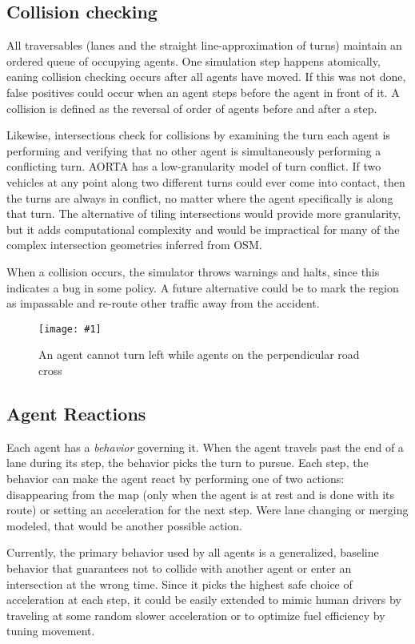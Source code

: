 \documentclass[letterpaper, 10 pt, conference]{ieeeconf}  %
\newcommand{\pix}[3]{
  \begin{figure}[h]
    \centering \texttt{[image: \#1]}
    \caption{#2}
  \end{figure}
}
\begin{document}
\subsection{Collision checking}

All traversables (lanes and the straight line-approximation of turns) maintain
an ordered queue of occupying agents. One simulation step happens atomically,
eaning collision checking occurs after all agents have moved. If this was not
done, false positives could occur when an agent steps before the agent in front
of it. A collision is defined as the reversal of order of agents before and
after a step.

Likewise, intersections check for collisions by examining the turn each agent is
performing and verifying that no other agent is simultaneously performing a
conflicting turn. AORTA has a low-granularity model of turn conflict. If two
vehicles at any point along two different turns could ever come into contact,
then the turns are always in conflict, no matter where the agent specifically is
along that turn. The alternative of tiling intersections \cite{JAIR08-dresner}
would provide more granularity, but it adds computational complexity and would
be impractical for many of the complex intersection geometries inferred from
OSM.

When a collision occurs, the simulator throws warnings and halts, since this
indicates a bug in some policy. A future alternative could be to mark the region
as impassable and re-route other traffic away from the accident.

\pix{turn_conflicts.png}
    {An agent cannot turn left while agents on the perpendicular road cross}
    {scale=0.5}

\subsection{Agent Reactions}

Each agent has a \emph{behavior} governing it. When the agent travels past the end
of a lane during its step, the behavior picks the turn to pursue. Each step,
the behavior can make the agent react by performing one of two actions:
disappearing from the map (only when the agent is at rest and is done with its
route) or setting an acceleration for the next step. Were lane changing or
merging modeled, that would be another possible action.

Currently, the primary behavior used by all agents is a generalized, baseline
behavior that guarantees not to collide with another agent or enter an
intersection at the wrong time. Since it picks the highest safe choice of
acceleration at each step, it could be easily extended to mimic human drivers by
traveling at some random slower acceleration or to optimize fuel efficiency
by tuning movement.
\end{document}
